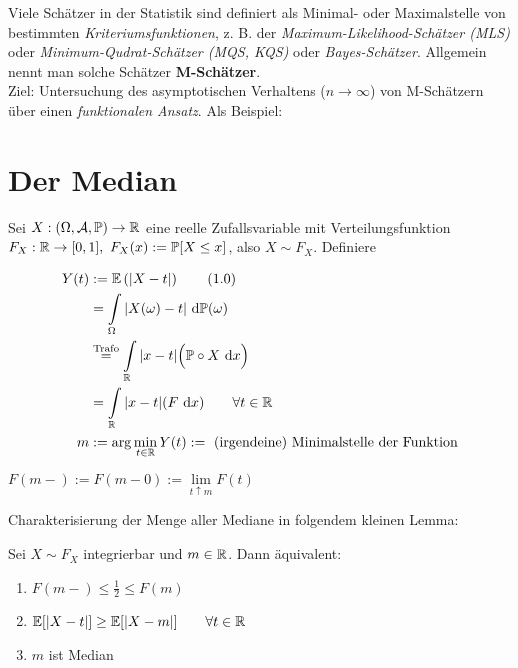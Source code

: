 
Viele Schätzer in der Statistik sind definiert als Minimal- oder Maximalstelle von bestimmten \textit{Kriteriumsfunktionen}, z. B. der \textit{Maximum-Likelihood-Schätzer (MLS)} oder \textit{Minimum-Qudrat-Schätzer (MQS, KQS)} oder \textit{Bayes-Schätzer}. Allgemein nennt man solche Schätzer \textbf{M-Schätzer}.\\
Ziel: Untersuchung des asymptotischen Verhaltens ($n\to\infty$) von M-Schätzern über einen \textit{funktionalen Ansatz}. Als Beispiel:

\section{Der Median}
Sei $X:(\Omega,\mathcal{A},\mathbb{P})\to\mathbb{R}$ eine reelle Zufallsvariable mit Verteilungsfunktion\\ $F_X:\mathbb{R}\to[0,1],~F_X(x):=\mathbb{P}[X\leq x]$, also $X\sim F_X$. Definiere

\begin{align}
Y(t)&:=\mathbb{E}\left(|X-t|\right)\label{DefY}\tag{1.0}\\ \nonumber
&=\int\limits_\Omega |X(\omega)-t|\text{ d}\mathbb{P}(\omega)\\ \nonumber
&\stackrel{\text{Trafo}}{=}
\int\limits_{\mathbb{R}}|x-t|\Big(\mathbb{P}\circ X\text{ d} x\Big)\\ \nonumber
&=\int\limits_{\mathbb{R}}|x-t|(F\text{ d} x) \nonumber
\qquad\forall t\in\mathbb{R}\\
m&:=\arg\min\limits_{t\in\mathbb{R}}Y(t):=\text{ (irgendeine) Minimalstelle der Funktion}\nonumber
\end{align} 

\begin{notation}
$F(m-):=F(m-0):=\lim\limits_{t\uparrow m} F(t)$
\end{notation}

Charakterisierung der Menge aller Mediane in folgendem kleinen Lemma:

\begin{lemma}\label{lemmaMedian}
Sei $X\sim F_X$ integrierbar und $m\in\mathbb{R}$. Dann äquivalent:
\begin{enumerate}[label=(\alph*)]
\item $F(m-)\leq\frac{1}{2}\leq F(m)$
\item $\mathbb{E}[|X-t|]\geq\mathbb{E}[|X-m|]\qquad\forall t\in\mathbb{R}$
\item $m$ ist Median
\end{enumerate}
\end{lemma}


